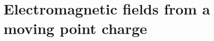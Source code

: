 \documentclass[12pt]{article}
\renewcommand{\vec}[1]{\boldsymbol{#1}}
\begin{document}


\section{Electromagnetic fields from a moving point charge}
\end{document}
